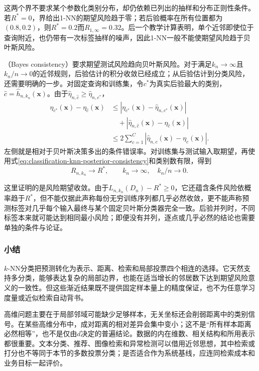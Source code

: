 这两个界不要求某个参数化类别分布，却仍依赖已列出的抽样和分布正则性条件。若$R^\ast=0$，界给出1-NN的期望风险趋于零；若后验概率在所有位置都为$(0.8,0.2)$，则$R^\ast=0.2$而$R_{1,\infty}=0.32$。后一个教学计算表明，单个近邻即使位于查询附近，也仍带有一次标签抽样的噪声，因此1-NN一般不能使期望风险趋于贝叶斯风险。

（Bayes consistency）要求期望测试风险趋向贝叶斯风险。对于满足$k_n\to\infty$且$k_n/n\to0$的近邻规则，后验估计的积分收敛已经成立；从后验估计到分类风险，还需要明确的一步。对固定查询和训练集，令$c^\ast$为真实后验最大的类别，$\hat c=\hat h_{n,k_n}(\bm{x})$。由于$\hat\eta_{n,\hat c}\geq\hat\eta_{n,c^\ast}$，
\begin{align*}
  \eta_{c^\ast}(\bm{x})-\eta_{\hat c}(\bm{x})
  &\leq|\eta_{c^\ast}(\bm{x})-\hat\eta_{n,c^\ast}(\bm{x})|\\
  &\quad+|\hat\eta_{n,\hat c}(\bm{x})-\eta_{\hat c}(\bm{x})|\\
  &\leq2\sum_{c=1}^{C}
    |\hat\eta_{n,c}(\bm{x})-\eta_c(\bm{x})|.
\end{align*}
左侧就是相对于贝叶斯决策多出的条件错误率。对训练集与测试输入取期望，再使用式\eqref{eq:classification-knn-posterior-consistency}和类别数有限，得到
\begin{equation}
  R_{n,k_n}\longrightarrow R^\ast,
  \qquad k_n\to\infty,\quad k_n/n\to0.
  \label{eq:classification-knn-bayes-consistency}
\end{equation}

这里证明的是风险期望收敛。由于$L_{n,k_n}(D_n)-R^\ast\geq0$，它还蕴含条件风险依概率趋于$R^\ast$，但不能仅据此声称每份无穷训练序列都几乎必然收敛，更不能声称预测标签对几乎每个输入最终与某个固定贝叶斯分类器完全一致。后验并列时，不同标签本来就可能达到相同最小风险；即便没有并列，逐点或几乎必然的结论也需要单独的条件与论证。

\subsubsection{小结}
\label{sec:classification-knn-summary}

$k$-NN分类把预测转化为表示、距离、检索和局部投票四个相连的选择。它天然支持多分类，能够表达复杂的局部边界，也能在适当增长的邻居数下达到期望风险意义的一致性。但这些渐近结果既不提供固定样本量上的精度保证，也不为任意学习度量或近似检索自动背书。

高维问题主要在于局部邻域可能缺少足够样本，无关坐标还会削弱距离中的类别信号。在某些高维分布中，成对距离的相对差异会集中变小；这不是“所有样本距离必然相等”，也不是仅由$d$决定的普遍结论。数据的内在维数、相关结构和所用表示都很重要。文本分类、推荐、图像检索和异常检测可以借用近邻思想，其中检索或打分也不等同于本节的多数投票分类；是否适合作为系统基线，应连同检索成本和业务目标一起评价。

